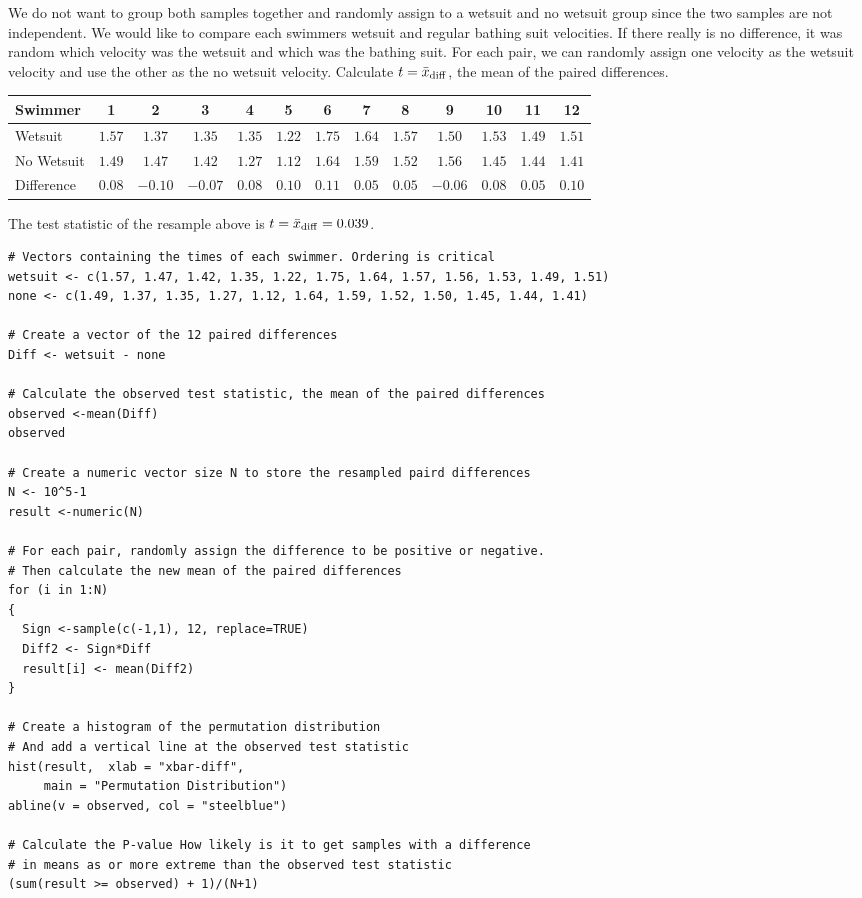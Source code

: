 \pagebreak

\bbox
\bi
\ii We do not want to group both samples together and randomly assign to a wetsuit and no wetsuit group since the two samples
are not independent.
\ii We would like to compare each swimmers wetsuit and regular bathing suit velocities.
\ii If there really is no difference, it was random which velocity was the wetsuit and which was the bathing suit.
\ii For each pair, we can randomly assign one velocity as the wetsuit velocity and use the other as the no wetsuit velocity.
\ii Calculate $t= \bar{x}_{\rm{diff}}$, the mean of the paired differences.
\ei
\ebox

\medskip
\begin{tabular}{l||c|c|c|c|c|c|c|c|c|c|c|c}
Swimmer & 1 & 2 & 3 & 4 & 5 & 6 & 7 & 8 & 9 & 10 & 11 & 12 \\
\hline
Wetsuit & $1.57$ & $\mathbf{1.37}$ & $\mathbf{1.35}$ & $1.35$ & $1.22$ & $1.75$ & $1.64$ & $1.57$ & $\mathbf{1.50}$ & $1.53$ & $1.49$ & $1.51$ \\
No Wetsuit & $1.49$ & $\mathbf{1.47}$ & $\mathbf{1.42}$ & $1.27$ & $1.12$ & $1.64$ & $1.59$ & $1.52$ & $\mathbf{1.56}$ & $1.45$ & $1.44$ & $1.41$ \\
\hline
Difference & $0.08$ &  $\mathbf{-0.10}$ &  $\mathbf{-0.07}$ &  $0.08$ &  $0.10$ & $0.11$ & $0.05$ & $0.05$ & $\mathbf{-0.06}$ & $0.08$ & $0.05$ &  $0.10$
\end{tabular}

\smallskip

The test statistic of the resample above is $t = \bar{x}_{\rm{diff}} = 0.039$. \smallskip


\begin{lstlisting}
# Vectors containing the times of each swimmer. Ordering is critical
wetsuit <- c(1.57, 1.47, 1.42, 1.35, 1.22, 1.75, 1.64, 1.57, 1.56, 1.53, 1.49, 1.51)
none <- c(1.49, 1.37, 1.35, 1.27, 1.12, 1.64, 1.59, 1.52, 1.50, 1.45, 1.44, 1.41)

# Create a vector of the 12 paired differences
Diff <- wetsuit - none

# Calculate the observed test statistic, the mean of the paired differences
observed <-mean(Diff) 
observed

# Create a numeric vector size N to store the resampled paird differences
N <- 10^5-1
result <-numeric(N)

# For each pair, randomly assign the difference to be positive or negative.
# Then calculate the new mean of the paired differences
for (i in 1:N)
{
  Sign <-sample(c(-1,1), 12, replace=TRUE)
  Diff2 <- Sign*Diff
  result[i] <- mean(Diff2)
}

# Create a histogram of the permutation distribution
# And add a vertical line at the observed test statistic
hist(result,  xlab = "xbar-diff",
     main = "Permutation Distribution")
abline(v = observed, col = "steelblue")

# Calculate the P-value How likely is it to get samples with a difference
# in means as or more extreme than the observed test statistic
(sum(result >= observed) + 1)/(N+1)
\end{lstlisting}

